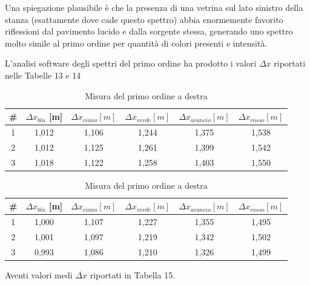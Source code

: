 \documentclass{article}
\begin{document}
\vspace{3mm}

Una spiegazione plausibile è che la presenza di una vetrina sul lato sinistro della stanza (esattamente dove cade questo spettro) abbia enormemente favorito riflessioni dal pavimento lucido e dalla sorgente stessa, generando uno spettro molto simile al primo ordine per quantità di colori presenti e intensità.

\vspace{3mm}

L'analisi software degli spettri del primo ordine ha prodotto i valori $\Delta x$ riportati nelle Tabelle 13 e 14

\begin{table}[h]
    \centering
    \begin{tabular}{||c|c|c|c|c|c||}
        \hline
        \# & \cellcolor{blue}$\Delta x_{blu}$ [m] & \cellcolor{cyan}$\Delta x_{ciano}[m]$ & \cellcolor{green}$\Delta x_{verde}[m]$ & \cellcolor{orange}$\Delta x_{arancio}[m]$ & \cellcolor{red}$\Delta x_{rosso}[m]$ \\
        \hline
        1 & 1,012 & 1,106 & 1,244 & 1,375 & 1,538 \\
        2 & 1,012 & 1,125 & 1,261 & 1,399 & 1,542 \\
        3 & 1,018 & 1,122 & 1,258 & 1,403 & 1,550 \\
        \hline
    \end{tabular}
    \caption{Misura del primo ordine a sinistra}
\centering
\begin{tabular}{||c|c|c|c|c|c||}
    \hline
    \# & \cellcolor{blue}$\Delta x_{blu}$ [m] & \cellcolor{cyan}$\Delta x_{ciano}[m]$ & \cellcolor{green}$\Delta x_{verde}[m]$ & \cellcolor{orange}$\Delta x_{arancio}[m]$ & \cellcolor{red}$\Delta x_{rosso}[m]$ \\
    \hline
    1 & 1,000 & 1,107 & 1,227 & 1,355 & 1,495 \\
    2 & 1,001 & 1,097 & 1,219 & 1,342 & 1,502\\
    3 & 0,993 & 1,086 & 1,210 & 1,326 & 1,499 \\
    \hline
\end{tabular}
\caption{Misura del primo ordine a destra}
\end{table}

Aventi valori medi $\overline{\Delta x}$ riportati in Tabella 15.
\end{document}
